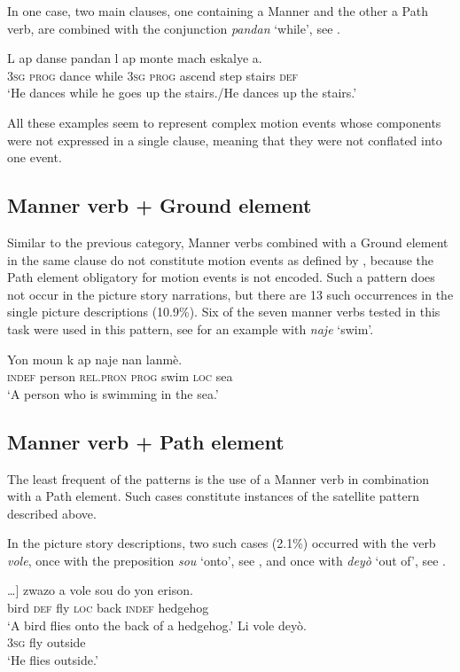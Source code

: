 \documentclass[output=paper,colorlinks,citecolor=brown]{langscibook}
\begin{document}
In one case, two main clauses, one containing a Manner and the other a Path verb, are combined with the conjunction \emph{pandan} ‘while’, see .

\ea\label{ex:3:51}
\gll L ap danse pandan l ap monte mach eskalye a.\\
     \textsc{3sg} \textsc{prog} dance while \textsc{3sg} \textsc{prog} ascend  step stairs \textsc{def}\\
\glt ‘He dances while he goes up the stairs./He dances up the stairs.’
\z

All these examples seem to represent complex motion events whose components were not expressed in a single clause, meaning that they were not conflated into one event.

\subsection{Manner verb + Ground element}

Similar to the previous category, Manner verbs combined with a Ground element in the same clause do not constitute motion events as defined by \citet{Talmy_1985}, because the Path element obligatory for motion events is not encoded. Such a pattern does not occur in the picture story narrations, but there are 13 such occurrences in the single picture descriptions (10.9\%). Six of the seven manner verbs tested in this task were used in this pattern, see  for an example with \emph{naje} ‘swim’.

\ea\label{ex:3:52}
\gll    Yon moun k ap naje nan lanmè.\\
        \textsc{indef} person \textsc{rel.pron} \textsc{prog} swim \textsc{loc} sea\\
\glt ‘A person who is swimming in the sea.’
\z

\subsection{Manner verb + Path element}

The least frequent of the patterns is the use of a Manner verb in combination with a Path element. Such cases constitute instances of the satellite pattern described above.

In the picture story descriptions, two such cases (2.1\%) occurred with the verb \emph{vole}, once with the preposition \emph{sou} ‘onto’, see , and once with \emph{deyò} ‘out of’, see .

\ea\label{ex:3:53}
\gll {[}…{]} zwazo a vole sou do yon erison. \\
      {}  bird \textsc{def} fly \textsc{loc} back \textsc{indef} hedgehog \\
\glt ‘A bird flies onto the back of a hedgehog.’
\ex\label{ex:3:54}
\gll    Li vole deyò. \\
        \textsc{3sg} fly outside  \\
\glt ‘He flies outside.’
\z
\end{document}
